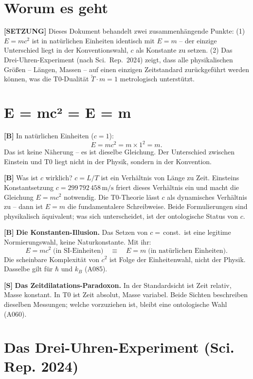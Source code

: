 \section{Worum es geht}

\textbf{[SETZUNG]} Dieses Dokument behandelt zwei zusammenhängende Punkte: (1)
$E=mc^2$ ist in natürlichen Einheiten identisch mit $E=m$ -- der einzige Unterschied
liegt in der Konventionswahl, $c$ als Konstante zu setzen. (2) Das Drei-Uhren-Experiment
(nach Sci.\ Rep.\ 2024) zeigt, dass alle physikalischen Größen -- Längen, Massen --
auf einen einzigen Zeitstandard zurückgeführt werden können, was die T0-Dualität
$\tilde T\cdot m=1$ metrologisch unterstützt.

\section{E = mc² = E = m}

\textbf{[B]} In natürlichen Einheiten ($c=1$):
\[
  E = mc^2 = m\times1^2 = m.
\]
Das ist keine Näherung -- es ist dieselbe Gleichung. Der Unterschied zwischen
Einstein und T0 liegt nicht in der Physik, sondern in der Konvention.

\textbf{[B]} Was ist $c$ wirklich? $c=L/T$ ist ein Verhältnis von Länge zu Zeit.
Einsteins Konstantsetzung $c=299\,792\,458\,\text{m/s}$ friert dieses Verhältnis
ein und macht die Gleichung $E=mc^2$ notwendig. Die T0-Theorie lässt $c$ als
dynamisches Verhältnis zu -- dann ist $E=m$ die fundamentalere Schreibweise. Beide
Formulierungen sind physikalisch äquivalent; was sich unterscheidet, ist der
ontologische Status von $c$.

\textbf{[B]} \textbf{Die Konstanten-Illusion.} Das Setzen von $c=$\,const.\ ist
eine legitime Normierungswahl, keine Naturkonstante. Mit ihr:
\[
  E=mc^2\;\text{(in SI-Einheiten)}
  \quad\equiv\quad
  E=m\;\text{(in natürlichen Einheiten)}.
\]
Die scheinbare Komplexität von $c^2$ ist Folge der Einheitenwahl, nicht der Physik.
Dasselbe gilt für $\hbar$ und $k_B$ (A085).

\textbf{[S]} \textbf{Das Zeitdilatations-Paradoxon.} In der Standardsicht ist
Zeit relativ, Masse konstant. In T0 ist Zeit absolut, Masse variabel. Beide Sichten
beschreiben dieselben Messungen; welche vorzuziehen ist, bleibt eine ontologische
Wahl (A060).

\section{Das Drei-Uhren-Experiment (Sci. Rep. 2024)}

